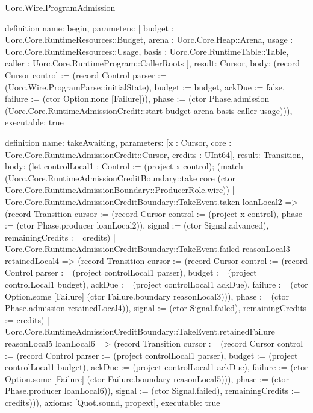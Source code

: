 \begin{lexlean}{Uorc.Wire.ProgramAdmission}
\begin{semanticmodule}
definition{
  name: begin,
  parameters: [
    budget : Uorc.Core.RuntimeResources::Budget,
    arena : Uorc.Core.Heap::Arena,
    usage : Uorc.Core.RuntimeResources::Usage,
    basis : Uorc.Core.RuntimeTable::Table,
    caller : Uorc.Core.RuntimeProgram::CallerRoots
  ],
  result: Cursor,
  body: (record Cursor {control := (record Control {parser := (Uorc.Wire.ProgramParse::initialState), budget := budget, ackDue := false, failure := (ctor Option.none [Failure])}), phase := (ctor Phase.admission (Uorc.Core.RuntimeAdmissionCredit::start budget arena basis caller usage))}),
  executable: true
}

definition{
  name: takeAwaiting,
  parameters: [x : Cursor, core : Uorc.Core.RuntimeAdmissionCredit::Cursor, credits : UInt64],
  result: Transition,
  body: (let controlLocal1 : Control := (project x control); (match (Uorc.Core.RuntimeAdmissionCreditBoundary::take core (ctor Uorc.Core.RuntimeAdmissionBoundary::ProducerRole.wire))
    | Uorc.Core.RuntimeAdmissionCreditBoundary::TakeEvent.taken loanLocal2 => (record Transition {cursor := (record Cursor {control := (project x control), phase := (ctor Phase.producer loanLocal2)}), signal := (ctor Signal.advanced), remainingCredits := credits})
    | Uorc.Core.RuntimeAdmissionCreditBoundary::TakeEvent.failed reasonLocal3 retainedLocal4 => (record Transition {cursor := (record Cursor {control := (record Control {parser := (project controlLocal1 parser), budget := (project controlLocal1 budget), ackDue := (project controlLocal1 ackDue), failure := (ctor Option.some [Failure] (ctor Failure.boundary reasonLocal3))}), phase := (ctor Phase.admission retainedLocal4)}), signal := (ctor Signal.failed), remainingCredits := credits})
    | Uorc.Core.RuntimeAdmissionCreditBoundary::TakeEvent.retainedFailure reasonLocal5 loanLocal6 => (record Transition {cursor := (record Cursor {control := (record Control {parser := (project controlLocal1 parser), budget := (project controlLocal1 budget), ackDue := (project controlLocal1 ackDue), failure := (ctor Option.some [Failure] (ctor Failure.boundary reasonLocal5))}), phase := (ctor Phase.producer loanLocal6)}), signal := (ctor Signal.failed), remainingCredits := credits}))),
  axioms: [Quot.sound, propext],
  executable: true
}


\end{semanticmodule}
\end{lexlean}
